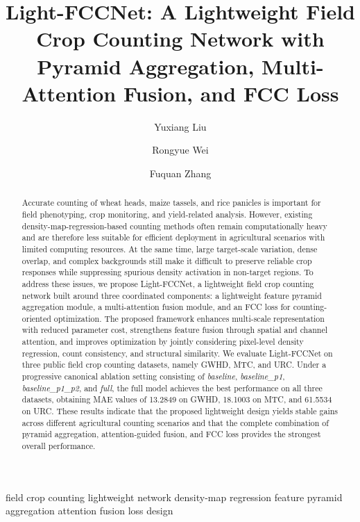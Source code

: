 \documentclass[a4paper,fleqn]{cas-sc}
\newcommand{\sep}{\quad}
\begin{document}
\let\WriteBookmarks\relax
\def\floatpagepagefraction{1}
\def\textpagefraction{.001}


\title[mode = title]{Light-FCCNet: A Lightweight Field Crop Counting Network with Pyramid Aggregation, Multi-Attention Fusion, and FCC Loss}

\author{Yuxiang Liu}
\author{Rongyue Wei}
\author{Fuquan Zhang}

\begin{abstract}
Accurate counting of wheat heads, maize tassels, and rice panicles is important for field phenotyping, crop monitoring, and yield-related analysis. However, existing density-map-regression-based counting methods often remain computationally heavy and are therefore less suitable for efficient deployment in agricultural scenarios with limited computing resources. At the same time, large target-scale variation, dense overlap, and complex backgrounds still make it difficult to preserve reliable crop responses while suppressing spurious density activation in non-target regions. To address these issues, we propose Light-FCCNet, a lightweight field crop counting network built around three coordinated components: a lightweight feature pyramid aggregation module, a multi-attention fusion module, and an FCC loss for counting-oriented optimization. The proposed framework enhances multi-scale representation with reduced parameter cost, strengthens feature fusion through spatial and channel attention, and improves optimization by jointly considering pixel-level density regression, count consistency, and structural similarity. We evaluate Light-FCCNet on three public field crop counting datasets, namely GWHD, MTC, and URC. Under a progressive canonical ablation setting consisting of \textit{baseline}, \textit{baseline\_p1}, \textit{baseline\_p1\_p2}, and \textit{full}, the full model achieves the best performance on all three datasets, obtaining MAE values of 13.2849 on GWHD, 18.1003 on MTC, and 61.5534 on URC. These results indicate that the proposed lightweight design yields stable gains across different agricultural counting scenarios and that the complete combination of pyramid aggregation, attention-guided fusion, and FCC loss provides the strongest overall performance.
\end{abstract}

\begin{keywords}
field crop counting \sep lightweight network \sep density-map regression \sep feature pyramid aggregation \sep attention fusion \sep loss design
\end{keywords}
\end{document}
